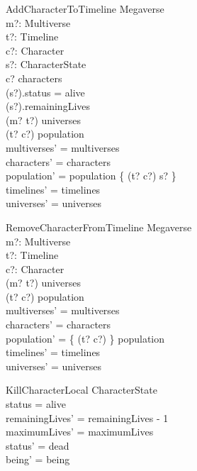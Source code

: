 \documentclass{article}
\begin{document}
\begin{schema}{AddCharacterToTimeline}
\Delta Megaverse \\
m?: Multiverse \\
t?: Timeline \\
c?: Character \\
s?: CharacterState \\ 
\where
c? \in characters \\
(s?).status = alive \\
(s?).remainingLives  \\
(m? \mapsto t?) \in universes \\
(t? \mapsto c?) \notin \dom population  \\
multiverses' = multiverses \\
characters' = characters \\
population' = population \cup \{ (t? \mapsto c?) \mapsto s? \} \\ 
timelines' = timelines \\
universes' = universes \\
\end{schema}

\begin{schema}{RemoveCharacterFromTimeline}
\Delta Megaverse \\
m?: Multiverse \\
t?: Timeline \\
c?: Character \\
\where
(m? \mapsto t?) \in universes \\
(t? \mapsto c?) \in \dom population  \\
multiverses' = multiverses \\
characters' = characters \\
population' = \{ (t? \mapsto c?) \} \ndres population \\ 
timelines' = timelines \\
universes' = universes \\
\end{schema}

\begin{schema}{KillCharacterLocal} 
\Delta CharacterState \\
\where
status = alive \\
remainingLives' = remainingLives - 1 \\
maximumLives' = maximumLives \\
status' = dead \\
being' = being \\
\end{schema}
\end{document}
